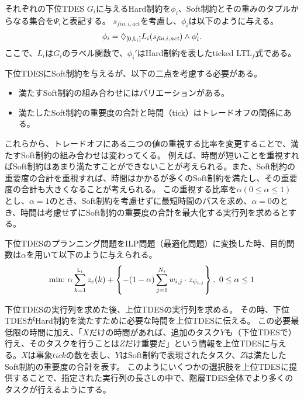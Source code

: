 \documentclass[ 10pt]{jsarticle}
\newcommand{\Len}{{\sf L}}
\begin{document}
それぞれの下位TDES $G_i$に与えるHard制約を$\phi_i$、Soft制約とその重みのタプルからなる集合を$\Psi_i$と表記する。
$s_{\textit{fin},i,\textit{act}}$を考慮し、$\phi_i$は以下のように与える。
\begin{align}
\phi_i=\Diamond_{[0,\Len_i]}L_i(s_{\textit{fin},i,\textit{act}}) \land \phi_i'.
\end{align}
ここで、$L_i$は$G_i$のラベル関数で、$\phi_i'$はHard制約を表したticked LTL${}_f$式である。


下位TDESにSoft制約を与えるが、以下の二点を考慮する必要がある。
\begin{itemize}
\item
満たすSoft制約の組み合わせにはバリエーションがある。
\item
満たしたSoft制約の重要度の合計と時間（tick）はトレードオフの関係にある。
\end{itemize}
これらから、トレードオフにある二つの値の重視する比率を変更することで、満たすSoft制約の組み合わせは変わってくる。
例えば、時間が短いことを重視すればSoft制約はあまり満たすことができないことが考えられる。また、Soft制約の重要度の合計を重視すれば、時間はかかるが多くのSoft制約を満たし、その重要度の合計も大きくなることが考えられる。
この重視する比率を$\alpha(0\leq\alpha\leq1)$とし、$\alpha=1$のとき、Soft制約を考慮せずに最短時間のパスを求め、$\alpha=0$のとき、時間は考慮せずにSoft制約の重要度の合計を最大化する実行列を求めるとする。

下位TDESのプランニング問題をILP問題（最適化問題）に変換した時、目的関数は$\alpha$を用いて以下のように与えられる。
\begin{align}\label{obj:alpha}
\mbox{min:}~\alpha\sum_{k=1}^{\Len_i}z_e(k) + \left\{-(1-\alpha)\sum_{j=1}^{N_i} w_{i,j}\cdot z_{\psi_{i,j}}\right\},~0\leq \alpha\leq 1
\end{align}
%

下位TDESの実行列を求めた後、上位TDESの実行列を求める。
その時、下位TDESがHard制約を満たすために必要な時間を上位TDESに伝える。
この必要最低限の時間に加え、「$X$だけの時間があれば、追加のタスク$Y$も（下位TDESで）行え、そのタスクを行うことは$Z$だけ重要だ」という情報を上位TDESに与える。$X$は事象$\textit{tick}$の数を表し、$Y$はSoft制約で表現されたタスク、$Z$は満たしたSoft制約の重要度の合計を表す。
このようにいくつかの選択肢を上位TDESに提供することで、指定された実行列の長さ$\Len$の中で、階層TDES全体でより多くのタスクが行えるようにする。
\end{document}
